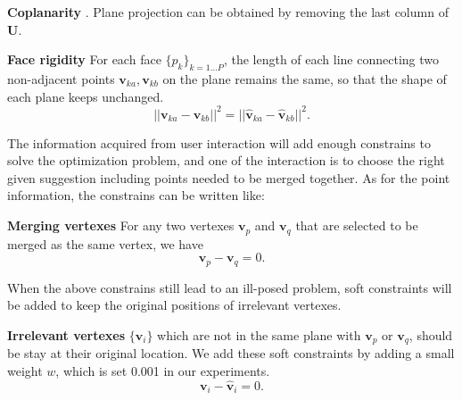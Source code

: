 \noindent
\textbf{Coplanarity} {. Plane projection can be obtained by removing the last column of $\mathbf{U}$. }

\noindent
\textbf{Face rigidity} For each face $\{p_k\}_{k=1 \dots P}$, the length of each line connecting two non-adjacent points $\mathbf{v}_{ka}, \mathbf{v}_{kb}$ on the plane remains the same, so that the shape of each plane keeps unchanged.
\begin{equation}
||\mathbf{v}_{ka} - \mathbf{v}_{kb}||^2 = ||\hat{\mathbf{v}}_{ka} - \hat{\mathbf{v}}_{kb}||^2.
\label{equ:plane}
\end{equation}

The information acquired from user interaction will add enough constrains to solve the optimization problem, and one of the interaction is to choose the right given suggestion including points needed to be merged together. As for the point information, the constrains can be written like:

\noindent
\textbf{Merging vertexes} For any two vertexes $\mathbf{v}_p$ and $\mathbf{v}_q$ that are selected to be merged as the same vertex, we have 
\begin{equation}
\mathbf{v}_p - \mathbf{v}_q = 0.
\label{equ:point}
\end{equation}


When the above constrains still lead to an ill-posed problem, soft constraints will be added to keep the original positions of irrelevant vertexes. 


\noindent
\textbf{Irrelevant vertexes} $\{\mathbf{v}_i\}$ which are not in the same plane with $\mathbf{v}_p$ or $\mathbf{v}_q$, should be stay at their original location. 
We add these soft constraints by adding a small weight $w$, which is set 0.001 in our experiments. 
\begin{equation}
\mathbf{v}_i - \mathbf{\hat{v}}_i = 0.
\label{equ:irrelevant}
\end{equation}

